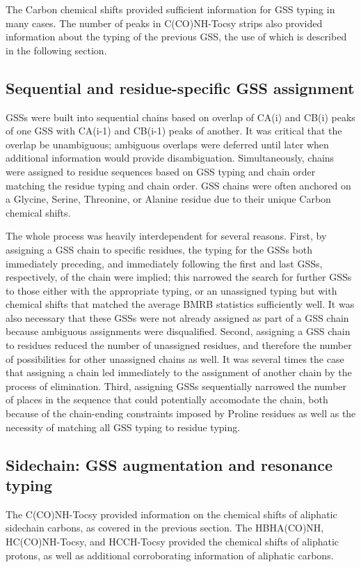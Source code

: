 The Carbon chemical shifts provided sufficient information for GSS typing
in many cases.  The number of peaks in C(CO)NH-Tocsy strips also provided 
information about the typing of the previous GSS, the use of which is described
in the following section.

\subsection{Sequential and residue-specific GSS assignment}
GSSs were built into sequential chains based on overlap of CA(i) and CB(i) 
peaks of one GSS with CA(i-1) and CB(i-1) peaks of another.  It was critical
that the overlap be unambiguous; ambiguous overlaps were deferred until later
when additional information would provide disambiguation.
Simultaneously, chains were assigned to residue sequences based on GSS typing
and chain order matching the residue typing and chain order.  GSS chains
were often anchored on a Glycine, Serine, Threonine, or Alanine residue due
to their unique Carbon chemical shifts.

The whole process was heavily interdependent for several reasons.  First, by
assigning a GSS chain to specific residues, the typing for the GSSs both
immediately preceding, and immediately following the first and last GSSs,
respectively, of the chain were implied; this narrowed the search for further
GSSs to those either with the appropriate typing, or an unassigned typing but
with chemical shifts that matched the average BMRB statistics sufficiently 
well.  It was also necessary that these GSSs were not already assigned as 
part of a GSS chain because ambiguous assignments were disqualified.
Second, assigning a GSS chain to residues reduced the number of unassigned
residues, and therefore the number of possibilities for other unassigned chains
as well.  It was several times the case that assigning a chain led immediately
to the assignment of another chain by the process of elimination.  Third,
assigning GSSs sequentially narrowed the number of places in the sequence that
could potentially accomodate the chain, both because of the chain-ending
constraints imposed by Proline residues as well as the necessity of matching
all GSS typing to residue typing.

\subsection{Sidechain: GSS augmentation and resonance typing}
The C(CO)NH-Tocsy provided information on the chemical shifts of aliphatic
sidechain carbons, as covered in the previous section.  The HBHA(CO)NH, 
HC(CO)NH-Tocsy, and HCCH-Tocsy provided the chemical shifts of aliphatic
protons, as well as additional corroborating information of aliphatic carbons.

